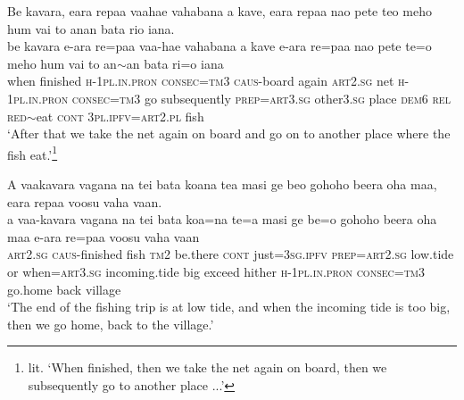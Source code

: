 \newpage
\ea\label{ex:text23-17}
Be kavara, eara repaa vaahae vahabana a kave, eara repaa nao pete teo meho hum vai to anan bata rio iana.\\
\gll be	kavara	e-ara	re=paa	vaa-hae	vahabana	a	kave	e-ara	re=paa	nao	pete	te=o	meho	hum	vai	to	an{$\sim$}an	bata	ri=o	iana\\
     when	finished	\textsc{h}-1\textsc{pl}.\textsc{in}.\textsc{pron}	\textsc{consec}=\textsc{tm}3	\textsc{caus}-board	again	\textsc{art}2.\textsc{sg}	net	\textsc{h}-1\textsc{pl}.\textsc{in}.\textsc{pron}	\textsc{consec}=\textsc{tm}3	go	subsequently	\textsc{prep}=\textsc{art}3.\textsc{sg}	other3.\textsc{sg}	place	\textsc{dem}6	\textsc{rel}	\textsc{red}{$\sim$}eat	\textsc{cont}	3\textsc{pl}.\textsc{ipfv}=\textsc{art}2.\textsc{pl}	fish\\
\glt `After that we take the net again on board and go on to another place where the fish eat.'\footnote{lit. `When finished, then we take the net again on board, then we subsequently go to another place ...'}
\z

\ea\label{ex:text23-18}
A vaakavara vagana na tei bata koana tea masi ge beo gohoho beera oha maa, eara repaa voosu vaha vaan.\\
\gll a	vaa-kavara	vagana	na	tei	bata	koa=na	te=a	masi	ge	be=o	gohoho	beera	oha	maa	e-ara	re=paa	voosu	vaha	vaan\\
     \textsc{art}2.\textsc{sg}	\textsc{caus}-finished	fish	\textsc{tm}2	be.there	\textsc{cont}	just=3\textsc{sg}.\textsc{ipfv}	\textsc{prep}=\textsc{art}2.\textsc{sg}	low.tide	or	when=\textsc{art}3.\textsc{sg}	incoming.tide	big	exceed	hither	\textsc{h}-1\textsc{pl}.\textsc{in}.\textsc{pron}	\textsc{consec}=\textsc{tm}3	go.home	back	village\\
\glt `The end of the fishing trip is at low tide, and when the incoming tide is too big, then we go home, back to the village.'
\z
